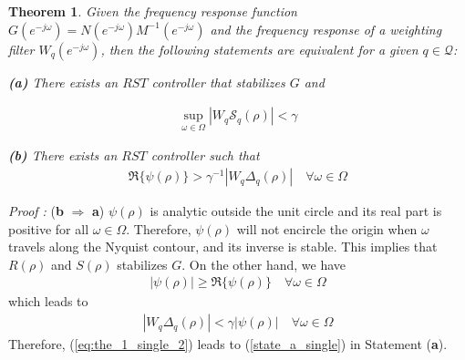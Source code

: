 \documentclass[journal]{IEEEtran}
\newtheorem{theorem}{Theorem}
\newcommand{\jo}{(e^{-j\omega})}
\begin{document}
\begin{theorem}  \label{Th1}
Given the frequency response function $G\jo = N\jo M^{-1}\jo$ and the frequency response of a weighting filter $W_q\jo$, then the following statements are equivalent for a given $q \in \mathcal{Q}$: 

{\bf (a)} There exists an $RST$ controller that stabilizes $G$ and 

	\begin{equation}
	\label{state_a_single}
	\begin{aligned}
	\sup_{\omega \in \Omega}  | {W_q \mathcal{S}_q(\rho)} | < \gamma 
	\end{aligned}
	\end{equation}
	


{\bf (b)} There exists an $RST$ controller such that
\begin{equation} \label{state_b_single}
\begin{aligned}
\Re\{\psi(\rho)\}  >\gamma ^{-1}|W_q\Delta_q(\rho)|\quad \forall \omega \in \Omega
 \end{aligned} 
\end{equation}
\end{theorem}
{\it Proof :} ({\bf b} $\Rightarrow$ {\bf a}) 
$\psi(\rho)$ is analytic outside the unit circle and its real part is positive for all $\omega \in \Omega$. Therefore, $\psi(\rho)$ will not encircle the origin when $\omega$ travels along the Nyquist contour, and its inverse is stable. This implies that $R(\rho)$ and $S(\rho)$ stabilizes $G$. On the other hand, we have
\begin{equation}  \nonumber
\begin{aligned}
|\psi(\rho)| \geq \Re\{\psi(\rho)\} \quad 
\forall \omega \in \Omega
\end{aligned}
\end{equation}
which leads to
\begin{equation} \label{eq:the_1_single_2}
\begin{aligned}
|W_q\Delta_q(\rho)| < \gamma |\psi(\rho)| \quad \forall \omega \in \Omega
 \end{aligned}
\end{equation}
Therefore, (\ref{eq:the_1_single_2}) leads to (\ref{state_a_single}) in Statement ({\bf a}).  
\end{document}
